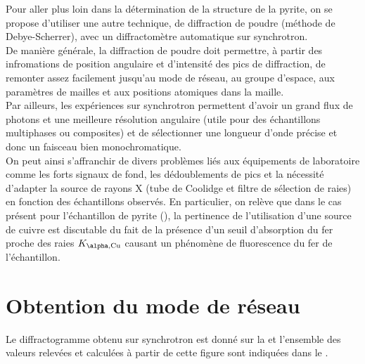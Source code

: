 Pour aller plus loin dans la détermination de la structure de la pyrite, on se propose d'utiliser une autre technique, de diffraction de poudre (méthode de Debye-Scherrer), avec un diffractomètre automatique sur synchrotron.\\
De manière générale, la diffraction de poudre doit permettre, à partir des infromations de position angulaire et d'intensité des pics de diffraction, de remonter assez facilement jusqu'au mode de réseau, au groupe d'espace, aux paramètres de mailles et aux positions atomiques dans la maille.
\\
Par ailleurs, les expériences sur synchrotron permettent d'avoir un grand flux de photons et une meilleure résolution angulaire (utile pour des échantillons multiphases ou composites) et de sélectionner une longueur d'onde précise et donc un faisceau bien monochromatique.\\
On peut ainsi s'affranchir de divers problèmes liés aux équipements de laboratoire comme les forts signaux de fond, les dédoublements de pics et la nécessité d'adapter la source de rayons X (tube de Coolidge et filtre de sélection de raies) en fonction des échantillons observés.
En particulier, on relève que dans le cas présent pour l'échantillon de pyrite (), la pertinence de l'utilisation d'une source de cuivre  est discutable du fait de la présence d'un seuil d'absorption du fer proche des raies \(K_{\alpha,\ce{Cu}}\) causant un phénomène de fluorescence du fer de l'échantillon.

\section{Obtention du mode de réseau}

Le diffractogramme obtenu sur synchrotron est donné sur la  et l'ensemble des valeurs relevées et calculées à partir de cette figure sont indiquées dans le .

